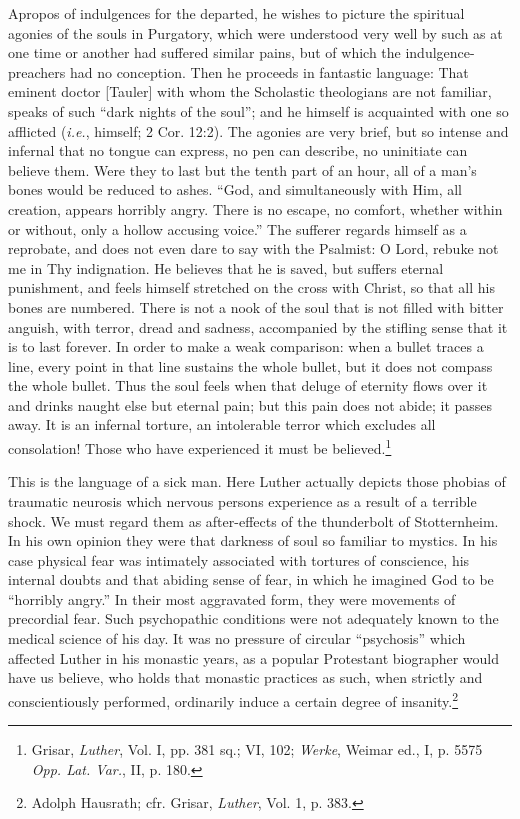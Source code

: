 Apropos of indulgences for the departed, he wishes to picture the spiritual
agonies of the souls in Purgatory, which were understood very well by such
as at one time or another had suffered similar pains, but of which the
indulgence-preachers had no conception. Then he proceeds in fantastic language:
That eminent doctor [Tauler] with whom the Scholastic theologians
are not familiar, speaks of such “dark nights of the soul”; and he himself is
acquainted with one so afflicted (\textit{i.e.}, himself; 2 Cor. 12:2).
The agonies are very brief, but so intense and infernal that no tongue can
express, no pen can describe, no uninitiate can believe them.
Were they to last but the tenth part of an hour, all of a man’s bones would
be reduced to ashes. “God, and simultaneously with Him, all creation,
appears horribly angry. There is no escape, no comfort, whether within or
without, only a hollow accusing voice.” The sufferer regards himself as a
reprobate, and does not even dare to say with the Psalmist: O Lord, rebuke
not me in Thy indignation. He believes that he is saved, but suffers eternal
punishment, and feels himself stretched on the cross with Christ, so that
all his bones are numbered. There is not a nook of the soul that is not filled
with bitter anguish, with terror, dread and sadness, accompanied by the
stifling sense that it is to last forever. In order to make a weak comparison:
when a bullet traces a line, every point in that line sustains the whole bullet,
but it does not compass the whole bullet. Thus the soul feels when that
deluge of eternity flows over it and drinks naught else but eternal pain;
but this pain does not abide; it passes away. It is an infernal torture, an
intolerable terror which excludes all consolation! Those who have experienced it must be believed.\footnote
{Grisar, \textit{Luther}, Vol. I, pp. 381 sq.; VI, 102; \textit{Werke}, Weimar ed., I, p. 5575 \textit{Opp. Lat.
Var.}, II, p. 180. }

This is the language of a sick man. Here Luther actually depicts
those phobias of traumatic neurosis which nervous persons experience
as a result of a terrible shock. We must regard them as after-effects
of the thunderbolt of Stotternheim. In his own opinion they were
that darkness of soul so familiar to mystics. In his case physical
fear was intimately associated with tortures of conscience, his internal
doubts and that abiding sense of fear, in which he imagined
God to be “horribly angry.” In their most aggravated form, they
were movements of precordial fear. Such psychopathic conditions
were not adequately known to the medical science of his day. It was
no pressure of circular “psychosis” which affected Luther in his
monastic years, as a popular Protestant biographer would have us
believe, who holds that monastic practices as such, when strictly and
conscientiously performed, ordinarily induce a certain degree of insanity.\footnote
{Adolph Hausrath; cfr. Grisar, \textit{Luther}, Vol. 1, p. 383.}


